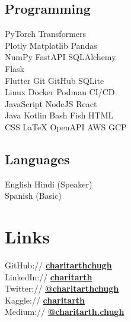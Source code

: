 \documentclass[]{resume-template}
\begin{document}
\begin{minipage}[t]{0.33\textwidth}
    \subsection{Programming}\label{subsec:programming}
    PyTorch \textbullet{} Transformers \textbullet{} \\
    Plotly \textbullet{} Matplotlib \textbullet{} Pandas \textbullet{}\\
    NumPy \textbullet{} FastAPI \textbullet SQLAlchemy \\ \textbullet{} Flask\\
    Flutter \textbullet{} Git \textbullet{} GitHub \textbullet{} SQLite \textbullet{}\\
    Linux \textbullet Docker \textbullet Podman \textbullet {} CI/CD \\
    JavaScript \textbullet{} NodeJS \textbullet{} React \\
    Java \textbullet{} Kotlin \textbullet{} Bash \textbullet{} Fish \textbullet{} HTML \textbullet{}\\
    CSS \textbullet{} \LaTeX \textbullet{} OpenAPI \textbullet{} AWS \textbullet{} GCP
    \vspace{\topsep}
    \subsection{Languages}
    English \textbullet{} Hindi (Speaker)\\
    Spanish (Basic)


    \section{Links}\label{sec:links}
    GitHub:// \href{https://github.com/charitarthchugh}{\textbf {charitarthchugh}} \\
    LinkedIn:// \href{https:///www.linkedin.com/in/charitarth}{\textbf {charitarth}} \\
    Twitter:// \href{https://twitter.com/charitarthchugh}{\textbf{@charitarthchugh}}\\
    Kaggle:// \href{https://kaggle.com/charitarth}{\textbf{charitarth}}\\
    Medium:// \href{https://medium.com/@charitarth.chugh}{\textbf{@charitarth.chugh}}\\

\end{minipage}
\end{document}
